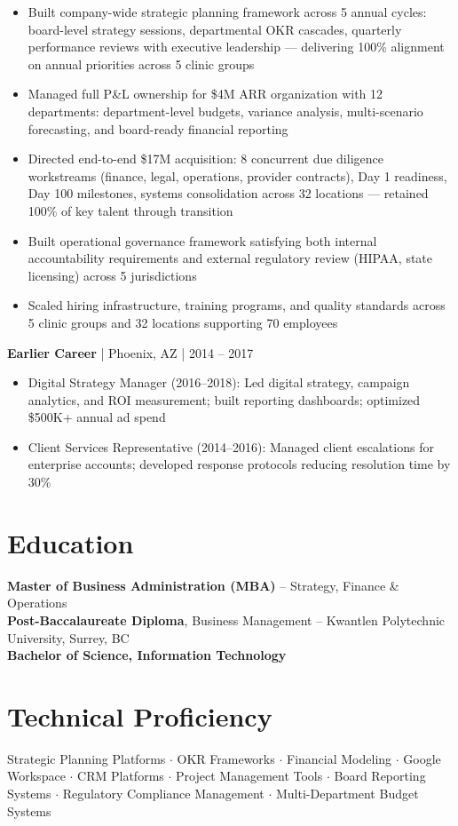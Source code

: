 \documentclass[10pt]{article}
\begin{document}
\begin{itemize}
  \item[\textbullet] Built company-wide strategic planning framework across 5 annual cycles: board-level strategy sessions, departmental OKR cascades, quarterly performance reviews with executive leadership --- delivering 100\% alignment on annual priorities across 5 clinic groups
  \item[\textbullet] Managed full P\&L ownership for \$4M ARR organization with 12 departments: department-level budgets, variance analysis, multi-scenario forecasting, and board-ready financial reporting
  \item[\textbullet] Directed end-to-end \$17M acquisition: 8 concurrent due diligence workstreams (finance, legal, operations, provider contracts), Day 1 readiness, Day 100 milestones, systems consolidation across 32 locations --- retained 100\% of key talent through transition
  \item[\textbullet] Built operational governance framework satisfying both internal accountability requirements and external regulatory review (HIPAA, state licensing) across 5 jurisdictions
  \item[\textbullet] Scaled hiring infrastructure, training programs, and quality standards across 5 clinic groups and 32 locations supporting 70 employees
\end{itemize}

\textbf{Earlier Career} \hspace{2pt}| Phoenix, AZ \hspace{2pt}| 2014 -- 2017

\begin{itemize}
  \item[\textbullet] Digital Strategy Manager (2016--2018): Led digital strategy, campaign analytics, and ROI measurement; built reporting dashboards; optimized \$500K+ annual ad spend
  \item[\textbullet] Client Services Representative (2014--2016): Managed client escalations for enterprise accounts; developed response protocols reducing resolution time by 30\%
\end{itemize}

\section*{Education}
\textbf{Master of Business Administration (MBA)} -- Strategy, Finance \& Operations \\
\textbf{Post-Baccalaureate Diploma}, Business Management -- Kwantlen Polytechnic University, Surrey, BC \\
\textbf{Bachelor of Science, Information Technology}

\section*{Technical Proficiency}
Strategic Planning Platforms $\cdot$ OKR Frameworks $\cdot$ Financial Modeling $\cdot$ Google Workspace $\cdot$ CRM Platforms $\cdot$ Project Management Tools $\cdot$ Board Reporting Systems $\cdot$ Regulatory Compliance Management $\cdot$ Multi-Department Budget Systems
\end{document}
